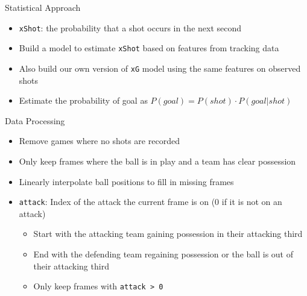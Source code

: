 \documentclass[
  11pt,
  ignorenonframetext,
]{beamer}
\providecommand{\tightlist}{%
  \setlength{\itemsep}{0pt}\setlength{\parskip}{0pt}}
\begin{document}
\begin{frame}[fragile]{Statistical Approach}
\protect{}\label{statistical-approach}
\begin{itemize}
\tightlist
\item
  \texttt{xShot}: the probability that a shot occurs in the next second
\item
  Build a model to estimate \texttt{xShot} based on features from
  tracking data
\item
  Also build our own version of \texttt{xG} model using the same
  features on observed shots
\item
  Estimate the probability of goal as
  \(P(goal) = P(shot) \cdot P(goal | shot)\)
\end{itemize}
\end{frame}

\begin{frame}[fragile]{Data Processing}
\protect{}\label{data-processing}
\begin{itemize}
\tightlist
\item
  Remove games where no shots are recorded
\item
  Only keep frames where the ball is in play and a team has clear
  possession
\item
  Linearly interpolate ball positions to fill in missing frames
\item
  \texttt{attack}: Index of the attack the current frame is on (0 if it
  is not on an attack)

  \begin{itemize}
  \tightlist
  \item
    Start with the attacking team gaining possession in their attacking
    third
  \item
    End with the defending team regaining possession or the ball is out
    of their attacking third
  \item
    Only keep frames with \texttt{attack\ \textgreater{}\ 0}
  \end{itemize}
\end{itemize}
\end{frame}
\end{document}
